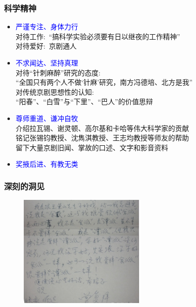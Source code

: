 \frame
{
	\frametitle{科学精神}
	\begin{itemize}
		\item \textcolor{blue}{严谨专注、身体力行}\\
			对待工作:~``搞科学实验必须要有日以继夜的工作精神''\\
			\vskip 1pt
			对待爱好:~京剧通人 
		\item \textcolor{blue}{不求闻达、坚持真理}\\
			对待``针刺麻醉''研究的态度:\\
			``全国只有两个人不做‘针麻’研究，南方冯德培、北方是我''\\
			\vskip 1pt
			对传统京剧思想性的认知:\\
			``阳春''、``白雪''与``下里''、``巴人''的价值思辩
		\item \textcolor{blue}{尊师重道、谦冲自牧}\\
			介绍拉瓦锡、谢灵顿、高尔基和卡哈等伟大科学家的贡献\\
			铭记张锡钧教授、沈雋淇教授、王志均教授等师友的帮助\\
			\vskip 1pt
			留下大量京剧旧闻、掌故的口述、文字和影音资料
		\item \textcolor{blue}{奖掖后进、有教无类}
	\end{itemize}
}

\frame
{
	\frametitle{深刻的洞见}
{\fontsize{7.2pt}{4.2pt}}
\begin{figure}[h!]
\centering
\vspace{0.05in}
\includegraphics[height=0.45\textwidth,width=0.55\textwidth,viewport=0 0 1198 1067,clip]{Figures_Peking-Opera/Liu_Letter.jpg}
\label{Liu_Letter}
\end{figure}
}

